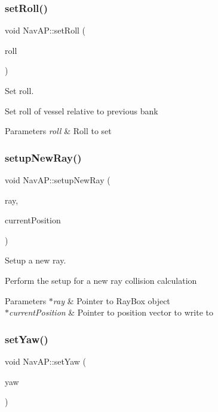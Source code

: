 \subsubsection{\texorpdfstring{set\+Roll()}{setRoll()}}
{\footnotesize\ttfamily void Nav\+A\+P\+::set\+Roll (\begin{DoxyParamCaption}\item[{double}]{roll }\end{DoxyParamCaption})\hspace{0.3cm}{\ttfamily [private]}}



Set roll. 

Set roll of vessel relative to previous bank 
\begin{DoxyParams}{Parameters}
{\em roll} & Roll to set \\
\hline
\end{DoxyParams}
\mbox{\label{classNavAP_ac1e6cebd415ba734ad897ebdc02b249a}} 
\subsubsection{\texorpdfstring{setup\+New\+Ray()}{setupNewRay()}}
{\footnotesize\ttfamily void Nav\+A\+P\+::setup\+New\+Ray (\begin{DoxyParamCaption}\item[{Ray\+Box $\ast$}]{ray,  }\item[{v3 $\ast$}]{current\+Position }\end{DoxyParamCaption})\hspace{0.3cm}{\ttfamily [private]}}



Setup a new ray. 

Perform the setup for a new ray collision calculation 
\begin{DoxyParams}{Parameters}
{\em $\ast$ray} & Pointer to Ray\+Box object \\
\hline
{\em $\ast$current\+Position} & Pointer to position vector to write to \\
\hline
\end{DoxyParams}
\mbox{\label{classNavAP_a6f935cc2ad075ffa1eaffc8814a2d29e}} 
\subsubsection{\texorpdfstring{set\+Yaw()}{setYaw()}}
{\footnotesize\ttfamily void Nav\+A\+P\+::set\+Yaw (\begin{DoxyParamCaption}\item[{double}]{yaw }\end{DoxyParamCaption})\hspace{0.3cm}{\ttfamily [private]}}



